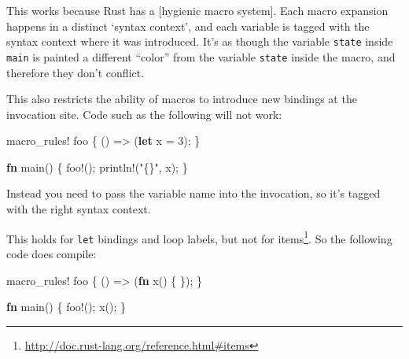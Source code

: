\documentclass[a4paper,]{book}
\newenvironment{Shaded}{\begin{snugshade}}{\end{snugshade}}
\newcommand{\KeywordTok}[1]{\textcolor[rgb]{0.13,0.29,0.53}{\textbf{{#1}}}}
\newcommand{\DecValTok}[1]{\textcolor[rgb]{0.00,0.00,0.81}{{#1}}}
\newcommand{\StringTok}[1]{\textcolor[rgb]{0.31,0.60,0.02}{{#1}}}
\newcommand{\OtherTok}[1]{\textcolor[rgb]{0.56,0.35,0.01}{{#1}}}
\newcommand{\NormalTok}[1]{{#1}}
\renewcommand{\href}[2]{#2\footnote{\url{#1}}}
\begin{document}
This works because Rust has a {[}hygienic macro system{]}. Each macro
expansion happens in a distinct `syntax context', and each variable is
tagged with the syntax context where it was introduced. It's as though
the variable \texttt{state} inside \texttt{main} is painted a different
``color'' from the variable \texttt{state} inside the macro, and
therefore they don't conflict.

This also restricts the ability of macros to introduce new bindings at
the invocation site. Code such as the following will not work:

\begin{Shaded}
\begin{Highlighting}[]
\OtherTok{macro_rules!} \NormalTok{foo \{}
    \NormalTok{() => (}\KeywordTok{let} \NormalTok{x = }\DecValTok{3}\NormalTok{);}
\NormalTok{\}}

\KeywordTok{fn} \NormalTok{main() \{}
    \OtherTok{foo!}\NormalTok{();}
    \OtherTok{println!}\NormalTok{(}\StringTok{"\{\}"}\NormalTok{, x);}
\NormalTok{\}}
\end{Highlighting}
\end{Shaded}

Instead you need to pass the variable name into the invocation, so it's
tagged with the right syntax context.

\begin{Shaded}
\end{Shaded}

This holds for \texttt{let} bindings and loop labels, but not for
\href{http://doc.rust-lang.org/reference.html\#items}{items}. So the
following code does compile:

\begin{Shaded}
\begin{Highlighting}[]
\OtherTok{macro_rules!} \NormalTok{foo \{}
    \NormalTok{() => (}\KeywordTok{fn} \NormalTok{x() \{ \});}
\NormalTok{\}}

\KeywordTok{fn} \NormalTok{main() \{}
    \OtherTok{foo!}\NormalTok{();}
    \NormalTok{x();}
\NormalTok{\}}
\end{Highlighting}
\end{Shaded}
\end{document}

